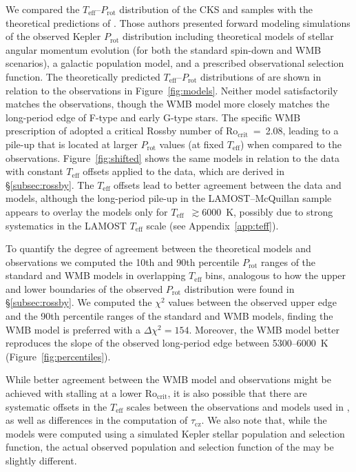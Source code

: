 \documentclass[linenumbers,trackchanges,twocolumn]{aastex631}
\newcommand{\taucz}{$\tau_\mathrm{cz}$\xspace}
\newcommand{\rocrit}{$\mathrm{Ro_{crit}}$\xspace}
\newcommand{\lamostmcq}{LAMOST--McQuillan\xspace}
\newcommand{\teff}{\ensuremath{T_{\mathrm{eff}}}\xspace}
\newcommand{\prot}{\ensuremath{P_\mathrm{rot}}\xspace}
\begin{document}
We compared the \teff--\prot distribution of the CKS and \edit1{\lamostmcq} samples with the theoretical predictions of \citet{vanSaders2019}. Those authors presented forward modeling simulations of the observed Kepler \prot distribution including theoretical models of stellar angular momentum evolution (for both the standard spin-down and WMB scenarios), a galactic population model, and a prescribed observational selection function. The theoretically predicted \teff--\prot distributions of \citet{vanSaders2019} are shown in relation to the observations in Figure~\ref{fig:models}. Neither model satisfactorily matches the observations, though the WMB model more closely matches the long-period edge of F-type and early G-type stars. The specific WMB prescription of \citet{vanSaders2019} adopted a critical Rossby number of \rocrit~=~2.08, leading to a pile-up that is located at larger \prot values (at fixed \teff) when compared to the observations. Figure~\ref{fig:shifted} shows the same models in relation to the data with constant \teff offsets applied to the data, which are derived in \S\ref{subsec:rossby}. The \teff offsets lead to better agreement between the data and models, although the long-period pile-up in the \lamostmcq sample appears to overlay the models only for \teff~$\gtrsim 6000$~K, possibly due to strong systematics in the LAMOST \teff scale (see Appendix~\ref{app:teff}).

To quantify the degree of agreement between the theoretical models and observations we computed the 10th and 90th percentile \prot ranges of the standard and WMB models in overlapping \teff bins, analogous to how the upper and lower boundaries of the observed \prot distribution were found in \S\ref{subsec:rossby}. We computed the $\chi^2$ values between the observed upper edge and the 90th percentile ranges of the standard and WMB models, finding the WMB model is preferred with a $\Delta \chi^2 = 154$. Moreover, the WMB model better reproduces the slope of the observed long-period edge between 5300--6000~K (Figure~\ref{fig:percentiles}). 

While better agreement between the WMB model and observations might be achieved with stalling at a lower \rocrit, it is also possible that there are systematic offsets in the \teff scales between the observations and models used in \citet{vanSaders2019}, as well as differences in the computation of \taucz.  We also note that, while the models were computed using a simulated Kepler stellar population and selection function, the actual observed population and selection function of the \edit1{\lamostmcq} may be slightly different. 
\end{document}

